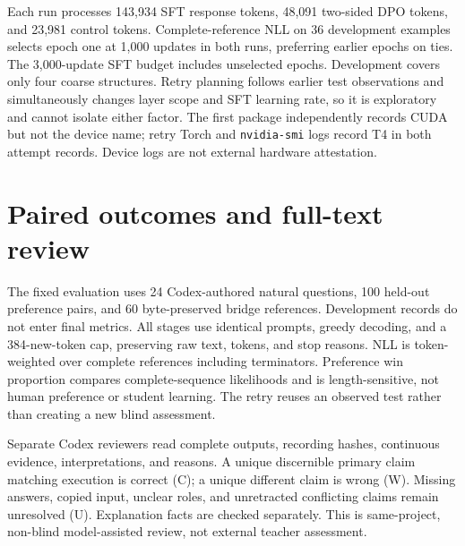 Each run processes 143,934 SFT response tokens, 48,091 two-sided DPO tokens, and 23,981 control tokens. Complete-reference NLL on 36 development examples selects epoch one at 1,000 updates in both runs, preferring earlier epochs on ties. The 3,000-update SFT budget includes unselected epochs. Development covers only four coarse structures. Retry planning follows earlier test observations and simultaneously changes layer scope and SFT learning rate, so it is exploratory and cannot isolate either factor. The first package independently records CUDA but not the device name; retry Torch and \texttt{nvidia-smi} logs record T4 in both attempt records. Device logs are not external hardware attestation. 

\section{Paired outcomes and full-text review}
The fixed evaluation uses 24 Codex-authored natural questions, 100 held-out preference pairs, and 60 byte-preserved bridge references. Development records do not enter final metrics. All stages use identical prompts, greedy decoding, and a 384-new-token cap, preserving raw text, tokens, and stop reasons. NLL is token-weighted over complete references including terminators. Preference win proportion compares complete-sequence likelihoods and is length-sensitive, not human preference or student learning. The retry reuses an observed test rather than creating a new blind assessment.

Separate Codex reviewers read complete outputs, recording hashes, continuous evidence, interpretations, and reasons. A unique discernible primary claim matching execution is correct (C); a unique different claim is wrong (W). Missing answers, copied input, unclear roles, and unretracted conflicting claims remain unresolved (U). Explanation facts are checked separately. This is same-project, non-blind model-assisted review, not external teacher assessment.

